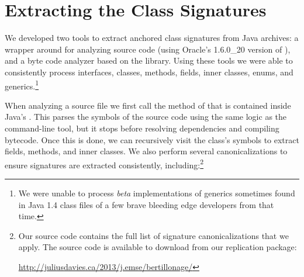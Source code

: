 \section{Extracting the Class Signatures}
\label{subsec:extractSignature}

We developed two tools to extract anchored class signatures from Java
archives: a wrapper around  for analyzing source code (using Oracle's 1.6.0\_20 version of ),
and a byte code analyzer based on the  library.  Using these
tools we were able to consistently process interfaces, classes, methods,
fields, inner classes, enums, and generics.\footnote{We were unable to
process \emph{beta} implementations of generics sometimes found in Java 1.4
class files of a few brave bleeding edge developers from that time.}

When analyzing a source file we first call the  method of
 that is contained inside
Java's .  This parses the symbols of the source code
using the same logic as the command-line  tool, but it stops
before resolving dependencies and compiling bytecode.  Once this is done,
we can recursively visit the class's symbols to extract fields, methods,
and inner classes.  We also perform several canonicalizations to ensure
signatures are extracted consistently, including:\footnote{Our source code
contains the full list of signature canonicalizations that we apply.
The source code is available to download from our replication package:

\url{http://juliusdavies.ca/2013/j.emse/bertillonage/}}



